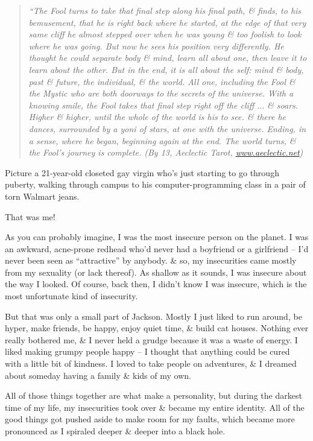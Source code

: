 \documentclass{article}
\numberwithin{equation}{section}
\begin{document}
\begin{quotation}\it
	``The Fool turns to take that final step along his final path, \& finds, to his bemusement, that he is right back where he started, at the edge of that very same cliff he almost stepped over when he was young \& too foolish to look where he was going. But now he sees his position very differently. He thought he could separate body \& mind, learn all about one, then leave it to learn about the other. But in the end, it is all about the self: mind \& body, past \& future, the individual, \& the world. All one, including the Fool \& the Mystic who are both doorways to the secrets of the universe. With a knowing smile, the Fool takes that final step right off the cliff $\ldots$ \& soars. Higher \& higher, until the whole of the world is his to see. \& there he dances, surrounded by a yoni of stars, at one with the universe. Ending, in a sense, where he began, beginning again at the end. The world turns, \& the Fool's journey is complete. (By 13, Aeclectic Tarot, \url{www.aeclectic.net})
\end{quotation}
Picture a 21-year-old closeted gay virgin who's just starting to go through puberty, walking through campus to his computer-programming class in a pair of torn Walmart jeans.

That was me!

As you can probably imagine, I was the most insecure person on the planet. I was an awkward, acne-prone redhead who'd never had a boyfriend or a girlfriend -- I'd never been seen as ``attractive'' by anybody. \& so, my insecurities came mostly from my sexuality (or lack thereof). As shallow as it sounds, I was insecure about the way I looked. Of course, back then, I didn't know I was insecure, which is the most unfortunate kind of insecurity.

But that was only a small part of Jackson. Mostly I just liked to run around, be hyper, make friends, be happy, enjoy quiet time, \& build cat houses. Nothing ever really bothered me, \& I never held a grudge because it was a waste of energy. I liked making grumpy people happy -- I thought that anything could be cured with a little bit of kindness. I loved to take people on adventures, \& I dreamed about someday having a family \& kids of my own.

All of those things together are what make a personality, but during the darkest time of my life, my insecurities took over \& became my entire identity. All of the good things got pushed aside to make room for my faults, which became more pronounced as I spiraled deeper \& deeper into a black hole.
\end{document}
